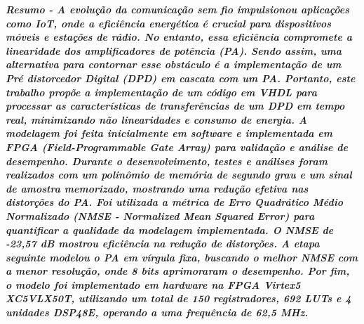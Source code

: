 \documentclass[twocolumn, a4paper]{article}
\begin{document}
\begin{strip}
	\vspace*{\dimexpr-\baselineskip-\stripsep\relax}
	\maketitle
	\vskip\baselineskip
	\noindent %
	\vskip\baselineskip
\end{strip}
\thispagestyle{specialfooter}
\vspace{3pt}\textbf{\textit{Resumo - A evolução da comunicação sem fio impulsionou aplicações como IoT, onde a eficiência energética é crucial para dispositivos móveis e estações de rádio. No entanto, essa eficiência compromete a linearidade dos amplificadores de potência (PA). Sendo assim, uma alternativa para contornar esse obstáculo é a implementação de um Pré distorcedor Digital (DPD) em cascata com um PA. Portanto, este trabalho propõe a implementação de um código em VHDL para processar as características de transferências de um DPD em tempo real, minimizando não linearidades e consumo de energia. A modelagem foi feita inicialmente em software e implementada em FPGA (Field-Programmable Gate Array) para validação e análise de desempenho. Durante o desenvolvimento, testes e análises foram realizados com um polinômio de memória de segundo grau e um sinal de amostra memorizado, mostrando uma redução efetiva nas distorções do PA. Foi utilizada a métrica de Erro Quadrático Médio Normalizado (NMSE - \textit{Normalized Mean Squared Error}) para quantificar a qualidade da modelagem implementada. O NMSE de -23,57 dB mostrou eficiência na redução de distorções. A etapa seguinte modelou o PA em vírgula fixa, buscando o melhor NMSE com a menor resolução, onde 8 bits aprimoraram o desempenho. Por fim, o modelo foi implementado em hardware na FPGA Virtex5 XC5VLX50T, utilizando um total de 150 registradores, 692 LUTs e 4 unidades DSP48E, operando a uma frequência de 62,5 MHz.}}
\end{document}
